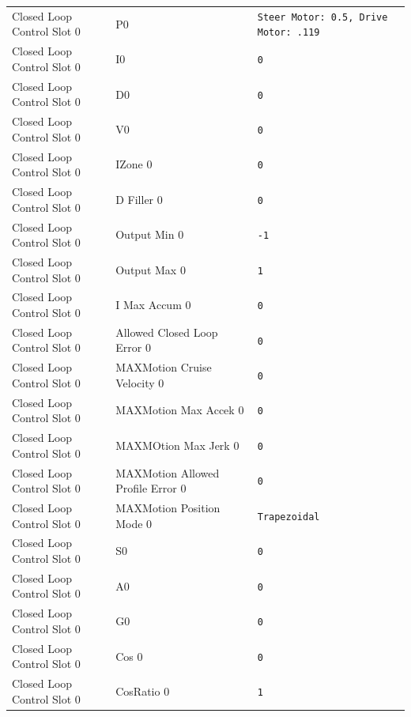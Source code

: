 \begin{longtable}{p{3.5cm} p{8cm} p{3cm}}
Closed Loop Control Slot 0 & P0 & \texttt{Steer Motor: 0.5, Drive Motor: .119} \\
Closed Loop Control Slot 0 & I0 & \texttt{0} \\
Closed Loop Control Slot 0 & D0 & \texttt{0} \\
Closed Loop Control Slot 0 & V0 & \texttt{0} \\
Closed Loop Control Slot 0 & IZone 0 & \texttt{0} \\
Closed Loop Control Slot 0 & D Filler 0 & \texttt{0} \\
Closed Loop Control Slot 0 & Output Min 0 & \texttt{-1} \\
Closed Loop Control Slot 0 & Output Max 0 & \texttt{1} \\
Closed Loop Control Slot 0 & I Max Accum 0 & \texttt{0} \\
Closed Loop Control Slot 0 & Allowed Closed Loop Error 0 & \texttt{0} \\
Closed Loop Control Slot 0 & MAXMotion Cruise Velocity 0 & \texttt{0} \\
Closed Loop Control Slot 0 & MAXMotion Max Accek 0 & \texttt{0} \\
Closed Loop Control Slot 0 & MAXMOtion Max Jerk 0 & \texttt{0} \\
Closed Loop Control Slot 0 & MAXMotion Allowed Profile Error 0 & \texttt{0} \\
Closed Loop Control Slot 0 & MAXMotion Position Mode 0 & \texttt{Trapezoidal} \\
Closed Loop Control Slot 0 & S0 & \texttt{0} \\
Closed Loop Control Slot 0 & A0 & \texttt{0} \\
Closed Loop Control Slot 0 & G0 & \texttt{0} \\
Closed Loop Control Slot 0 & Cos 0 & \texttt{0} \\
Closed Loop Control Slot 0 & CosRatio 0 & \texttt{1} \\


\end{longtable}
